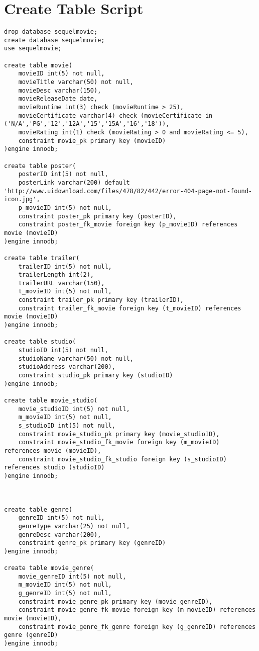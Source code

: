 \documentclass[12pt]{article}
\begin{document}
\section{Create Table Script}
\begin{lstlisting}
drop database sequelmovie;
create database sequelmovie;
use sequelmovie;

create table movie(
    movieID int(5) not null,
    movieTitle varchar(50) not null,
    movieDesc varchar(150),
    movieReleaseDate date,
    movieRuntime int(3) check (movieRuntime > 25),
    movieCertificate varchar(4) check (movieCertificate in ('N/A','PG','12','12A','15','15A','16','18')),
    movieRating int(1) check (movieRating > 0 and movieRating <= 5),
    constraint movie_pk primary key (movieID)
)engine innodb;

create table poster(
    posterID int(5) not null,
    posterLink varchar(200) default 'http://www.uidownload.com/files/478/82/442/error-404-page-not-found-icon.jpg',
    p_movieID int(5) not null,
    constraint poster_pk primary key (posterID),
    constraint poster_fk_movie foreign key (p_movieID) references movie (movieID)
)engine innodb;

create table trailer(
    trailerID int(5) not null,
    trailerLength int(2),
    trailerURL varchar(150),
    t_movieID int(5) not null,
    constraint trailer_pk primary key (trailerID),
    constraint trailer_fk_movie foreign key (t_movieID) references movie (movieID)
)engine innodb;

create table studio(
    studioID int(5) not null,
    studioName varchar(50) not null,
    studioAddress varchar(200),
    constraint studio_pk primary key (studioID)
)engine innodb;

create table movie_studio(
    movie_studioID int(5) not null,
    m_movieID int(5) not null,
    s_studioID int(5) not null,
    constraint movie_studio_pk primary key (movie_studioID),
    constraint movie_studio_fk_movie foreign key (m_movieID) references movie (movieID),
    constraint movie_studio_fk_studio foreign key (s_studioID) references studio (studioID)
)engine innodb;



create table genre(
    genreID int(5) not null,
    genreType varchar(25) not null,
    genreDesc varchar(200),
    constraint genre_pk primary key (genreID)
)engine innodb;

create table movie_genre(
    movie_genreID int(5) not null,
    m_movieID int(5) not null,
    g_genreID int(5) not null,
    constraint movie_genre_pk primary key (movie_genreID),
    constraint movie_genre_fk_movie foreign key (m_movieID) references movie (movieID),
    constraint movie_genre_fk_genre foreign key (g_genreID) references genre (genreID)
)engine innodb;


\end{lstlisting}
\end{document}
